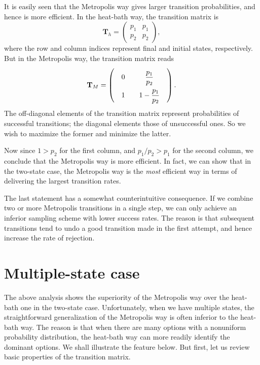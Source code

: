 \documentclass[12pt]{article}
\begin{document}
It is easily seen that
the Metropolis way gives larger transition probabilities,
and hence is more efficient.
%
In the heat-bath way, the transition matrix is
$$
\mathbf T_h =
\left(
  \begin{array}{ccc}
    p_1 & p_1 \\
    p_2 & p_2
  \end{array}
\right),
$$
where the row and column indices represent final and initial states,
respectively.
But in the Metropolis way, the transition matrix reads
$$
\mathbf T_M =
\left(
  \arraycolsep=10.0pt\def\arraystretch{2.0}
  \begin{array}{ccc}
    0 & \dfrac{ p_1 }{ p_2 }  \\
    1 & 1 - \dfrac{ p_1 }{ p_2 }
  \end{array}
\right).
$$
%
The off-diagonal elements of the transition matrix represent
probabilities of successful transitions;
the diagonal elements those of unsuccessful ones.
%
So we wish to maximize the former and minimize the latter.


Now since $1 > p_2$ for the first column,
and $p_1/p_2 > p_1$ for the second column,
we conclude that the Metropolis way is more efficient.
%
In fact, we can show that in the two-state case,
the Metropolis way is the \emph{most} efficient way
in terms of delivering the largest transition rates.

The last statement has a somewhat counterintuitive consequence.
If we combine two or more Metropolis transitions
in a single step, we can only achieve an inferior
sampling scheme with lower success rates.
The reason is that subsequent transitions tend to
undo a good transition made in the first attempt,
and hence increase the rate of rejection.




\section{Multiple-state case}

The above analysis shows the superiority of the Metropolis way
over the heat-bath one in the two-state case.
%
Unfortunately, when we have multiple states,
the straightforward generalization of the Metropolis way
is often inferior to the heat-bath way.
%
The reason is that when there are many options with
a nonuniform probability distribution,
the heat-bath way can more readily identify the dominant options.
%
We shall illustrate the feature below.
%
But first, let us review basic properties of the transition matrix.
\end{document}
